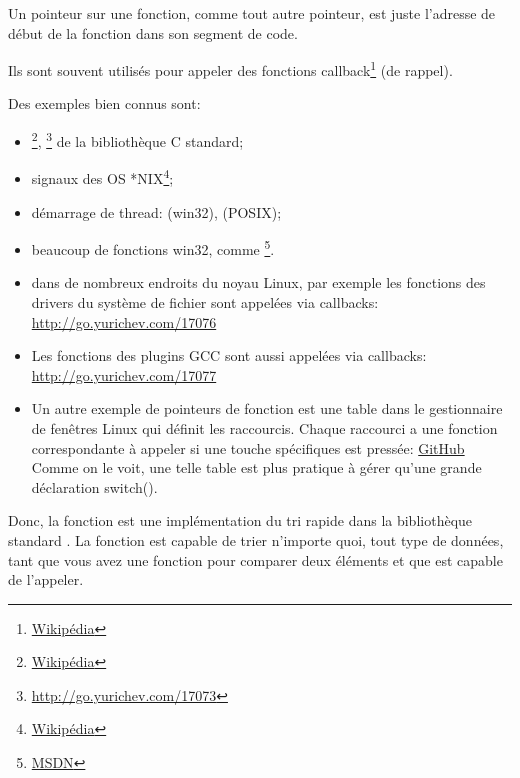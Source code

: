 \newcommand{\comp}{\TT{comp()}\xspace}
\label{sec:pointerstofunctions}

\myindex{\CLanguageElements!\Pointers}

Un pointeur sur une fonction, comme tout autre pointeur, est juste l'adresse de début
de la fonction dans son segment de code.

Ils sont souvent utilisés pour appeler des fonctions callback\footnote{\href{http://go.yurichev.com/17071}{Wikipédia}}
(de rappel).

Des exemples bien connus sont:

\begin{itemize}
\item \qsort\footnote{\href{http://go.yurichev.com/17072}{Wikipédia}},
{}\footnote{\url{http://go.yurichev.com/17073}} de la bibliothèque C standard; 

\item signaux des OS *NIX\footnote{\href{http://go.yurichev.com/17074}{Wikipédia}};

\item démarrage de thread:  (win32),  (POSIX);

\item beaucoup de fonctions win32, comme \footnote{\href{http://go.yurichev.com/17075}{MSDN}}.

\item dans de nombreux endroits du noyau Linux, par exemple les fonctions des drivers
du système de fichier sont appelées via callbacks: \url{http://go.yurichev.com/17076}

\item Les fonctions des plugins GCC sont aussi appelées via callbacks: 
\url{http://go.yurichev.com/17077}

\item Un autre exemple de pointeurs de fonction est une table dans le gestionnaire
de fenêtres Linux  qui définit les raccourcis. Chaque raccourci a une fonction
correspondante à appeler si une touche spécifiques est pressée: \href{http://go.yurichev.com/17078}{GitHub}
Comme on le voit, une telle table est plus pratique à gérer qu'une grande déclaration
switch().
\end{itemize}


Donc, la fonction \qsort est une implémentation du tri rapide dans la bibliothèque
standard \CCpp.
La fonction est capable de trier n'importe quoi, tout type de données, tant que vous
avez une fonction pour comparer deux éléments et que \qsort est capable de l'appeler.

